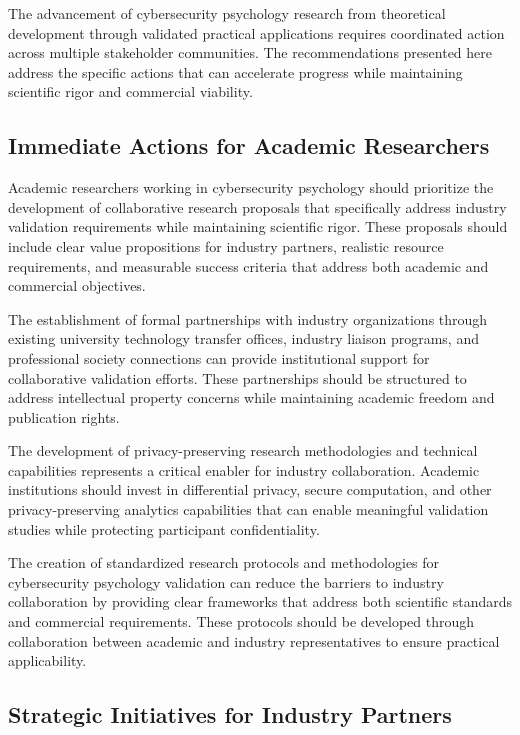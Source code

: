 \documentclass[10pt,twocolumn]{IEEEtran}
\begin{document}
The advancement of cybersecurity psychology research from theoretical development through validated practical applications requires coordinated action across multiple stakeholder communities. The recommendations presented here address the specific actions that can accelerate progress while maintaining scientific rigor and commercial viability.

\subsection{Immediate Actions for Academic Researchers}

Academic researchers working in cybersecurity psychology should prioritize the development of collaborative research proposals that specifically address industry validation requirements while maintaining scientific rigor. These proposals should include clear value propositions for industry partners, realistic resource requirements, and measurable success criteria that address both academic and commercial objectives.

The establishment of formal partnerships with industry organizations through existing university technology transfer offices, industry liaison programs, and professional society connections can provide institutional support for collaborative validation efforts. These partnerships should be structured to address intellectual property concerns while maintaining academic freedom and publication rights.

The development of privacy-preserving research methodologies and technical capabilities represents a critical enabler for industry collaboration. Academic institutions should invest in differential privacy, secure computation, and other privacy-preserving analytics capabilities that can enable meaningful validation studies while protecting participant confidentiality.

The creation of standardized research protocols and methodologies for cybersecurity psychology validation can reduce the barriers to industry collaboration by providing clear frameworks that address both scientific standards and commercial requirements. These protocols should be developed through collaboration between academic and industry representatives to ensure practical applicability.

\subsection{Strategic Initiatives for Industry Partners}
\end{document}
